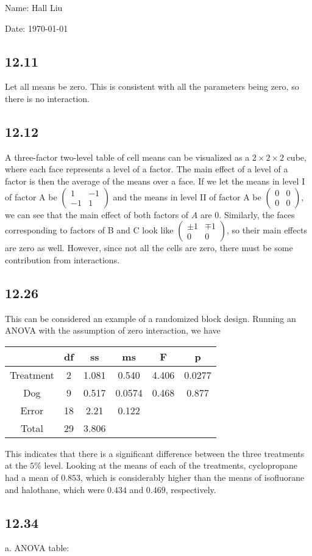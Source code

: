 \documentclass{article}
\newcommand{\openm}{\begin{pmatrix}}
\newcommand{\closem}{\end{pmatrix}}
\begin{document}
Name: Hall Liu

Date: \today 
\vspace{1.5cm}

\subsection*{12.11}
Let all means be zero. This is consistent with all the parameters being zero, so there is no interaction.
\subsection*{12.12}
A three-factor two-level table of cell means can be visualized as a $2\times2\times2$ cube, where each face represents a level of a factor. The main effect of a level of a factor is then the average of the means over a face. If we let the means in level I of factor A be $\openm1&-1\\-1&1\closem$ and the means in level II of factor A be $\openm0&0\\0&0\closem$, we can see that the main effect of both factors of $A$ are $0$. Similarly, the faces corresponding to factors of B and C look like $\openm\pm1&\mp1\\0&0\closem$, so their main effects are zero as well. However, since not all the cells are zero, there must be some contribution from interactions.
\subsection*{12.26}
This can be considered an example of a randomized block design. Running an ANOVA with the assumption of zero interaction, we have

\begin{tabular}{cccccc}
&df&ss&ms&F&p\\
\hline
Treatment&2&1.081&0.540&4.406&0.0277\\
Dog&9&0.517&0.0574&0.468&0.877\\
Error&18&2.21&0.122\\
Total&29&3.806\\
\end{tabular}

This indicates that there is a significant difference between the three treatments at the $5\%$ level. Looking at the means of each of the treatments, cyclopropane had a mean of $0.853$, which is considerably higher than the means of isofluorane and halothane, which were $0.434$ and $0.469$, respectively.
\subsection*{12.34}
a. ANOVA table:
\end{document}
